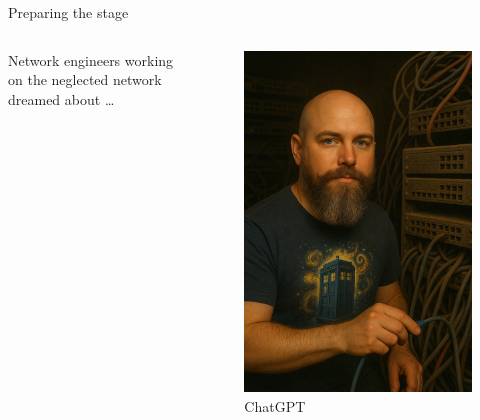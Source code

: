 \documentclass[aspectratio=169]{beamer}
\begin{document}
\begin{frame}{Preparing the stage}

  \begin{columns}
    \begin{column}{0.4\textwidth}
      Network engineers working on the neglected network dreamed about \dots
    \end{column}
    \begin{column}{0.4\textwidth}
      \begin{figure}
        \includegraphics[height = 0.7\textheight]{images/urs_old_datacenter.png}
        \caption{\footnotesize ChatGPT}
      \end{figure}
    \end{column}
  \end{columns}

\end{frame}
\end{document}
